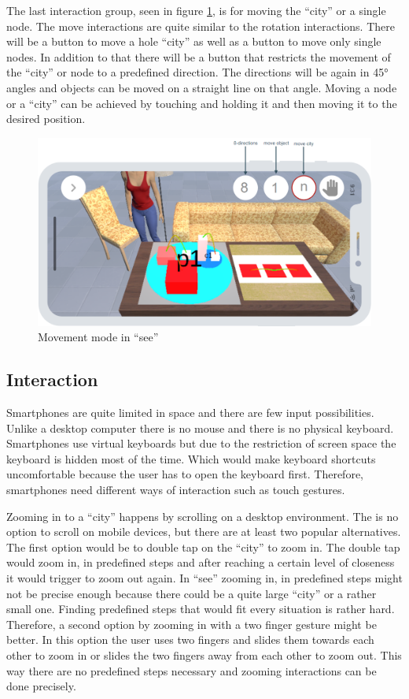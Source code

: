 The last interaction group, seen in figure \ref{fig:move}, is for moving the \enquote{\gls{city}} or a single node.
The move interactions are quite similar to the rotation interactions.
There will be a button to move a hole \enquote{\gls{city}} as well as a button to move only single nodes.
In addition to that there will be a button that restricts the movement of the \enquote{\gls{city}} or node to a predefined direction.
The directions will be again in 45° angles and objects can be moved on a straight line on that angle.
Moving a node or a \enquote{\gls{city}} can be achieved by touching and holding it and then moving it to the desired position.
\begin{figure}[htb]
    \centering
    \includegraphics[width=1\textwidth]{Concept/img/menu5.png}
    \caption{Movement mode in \enquote{\gls{see}}}\label{fig:move}
\end{figure}

\subsection{Interaction}

Smartphones are quite limited in space and there are few input possibilities.
Unlike a desktop computer there is no mouse and there is no physical keyboard.
Smartphones use virtual keyboards but due to the restriction of screen space the keyboard is hidden most of the time.
Which would make keyboard shortcuts uncomfortable because the user has to open the keyboard first.
Therefore, smartphones need different ways of interaction such as touch gestures. 

Zooming in to a \enquote{\gls{city}} happens by scrolling on a desktop environment. 
The is no option to scroll on mobile devices, but there are at least two popular alternatives.
The first option would be to double tap on the \enquote{\gls{city}} to zoom in.
The double tap would zoom in, in predefined steps and after reaching a certain level of closeness it would trigger to zoom out again.
In \enquote{\gls{see}} zooming in, in predefined steps might not be precise enough because there could be a quite large \enquote{\gls{city}} or a rather small one.
Finding predefined steps that would fit every situation is rather hard.
Therefore, a second option by zooming in with a two finger gesture might be better. 
In this option the user uses two fingers and slides them towards each other to zoom in or slides the two fingers away from each other to zoom out.
This way there are no predefined steps necessary and zooming interactions can be done precisely.
